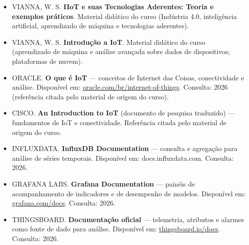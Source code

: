 \begin{itemize}
\tightlist
\item
  VIANNA, W. S. \textbf{IIoT e suas Tecnologias Aderentes: Teoria e exemplos práticos}. Material didático do curso (Indústria 4.0, inteligência artificial, aprendizado de máquina e tecnologias aderentes).
\item
  VIANNA, W. S. \textbf{Introdução a IoT}. Material didático do curso (aprendizado de máquina e análise avançada sobre dados de dispositivos; plataformas de nuvem).
\item
  ORACLE. \textbf{O que é IoT} --- conceitos de Internet das Coisas, conectividade e análise. Disponível em: \url{oracle.com/br/internet-of-things}. Consulta: 2026 (referência citada pelo material de origem do curso).
\item
  CISCO. \textbf{An Introduction to IoT} (documento de pesquisa traduzido) --- fundamentos de IoT e conectividade. Referência citada pelo material de origem do curso.
\item
  INFLUXDATA. \textbf{InfluxDB Documentation} --- consulta e agregação para análise de séries temporais. Disponível em: docs.influxdata.com. Consulta: 2026.
\item
  GRAFANA LABS. \textbf{Grafana Documentation} --- painéis de acompanhamento de indicadores e de desempenho de modelos. Disponível em: \url{grafana.com/docs}. Consulta: 2026.
\item
  THINGSBOARD. \textbf{Documentação oficial} --- telemetria, atributos e alarmes como fonte de dado para análise. Disponível em: \url{thingsboard.io/docs}. Consulta: 2026.
\end{itemize}
